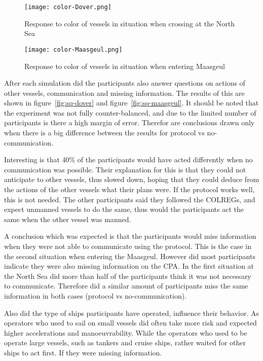 \begin{figure}[h]
	\centering
	\texttt{[image: color-Dover.png]}
	\caption{Response to color of vessels in situation when crossing at the North Sea}
	\label{fig:color-dover}
\end{figure}

\begin{figure}[h]
	\centering
	\texttt{[image: color-Maasgeul.png]}
	\caption{Response to color of vessels in situation when entering Maasgeul}
	\label{fig:color-maasgeul}
\end{figure}

After each simulation did the participants also answer questions on actions of other vessels, communication and missing information. The results of this are shown in figure~\ref{fig:sq-dover} and figure~\ref{fig:sq-maasgeul}. It should be noted that the experiment was not fully counter-balanced, and due to the limited number of participants is there a high margin of error. Therefor are conclusions drawn only when there is a big difference between the results for protocol vs no-communication. 

Interesting is that 40\% of the participants would have acted differently when no communication was possible. Their explanation for this is that they could not anticipate to other vessels, thus slowed down, hoping that they could deduce from the actions of the other vessels what their plans were. If the protocol works well, this is not needed. The other participants said they followed the \ac{COLREGs}, and expect unmanned vessels to do the same, thus would the participants act the same when the other vessel was manned.

A conclusion which was expected is that the participants would miss information when they were not able to communicate using the protocol. This is the case in the second situation when entering the Maasgeul. However did most participants indicate they were also missing information on the \ac{CPA}. In the first situation at the North Sea did more than half of the participants think it was not necessary to communicate. Therefore did a similar amount of participants miss the same information in both cases (protocol vs no-communication).

Also did the type of ships participants have operated, influence their behavior. As operators who used to sail on small vessels did often take more risk and expected higher accelerations and manoeuvrability. While the operators who used to be operate large vessels, such as tankers and cruise ships, rather waited for other ships to act first. If they were missing information.


